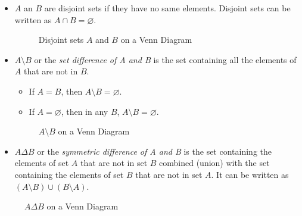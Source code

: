 \begin{itemize}
\begin{itemize}
		\item $A$ an $B$ are disjoint sets if they have no same elements. Disjoint sets can be written as $A \cap B=\varnothing$.
		\begin{figure}[!ht]
			\centering
			\caption{Disjoint sets $A$ and $B$ on a Venn Diagram}
		\end{figure}
		
		\item $A \setminus B$ or the \textit{set difference of A and B} is the set containing all the elements of $A$ that are not in $B$.
		\begin{itemize}
			\item If $A=B$, then $A \setminus B=\varnothing$.
			\item If $A=\varnothing$, then in any $B$, $A \setminus B=\varnothing$.
		\end{itemize}
		\begin{figure}[!ht]
			\centering
			\caption{$A \setminus B$ on a Venn Diagram}
		\end{figure}
		
		\item $A \Delta B$ or the \textit{symmetric difference of A and B} is  the set containing the elements of set $A$ that are not in set $B$ combined (union) with the set containing the elements of set $B$ that are not in set $A$. It can be written as $(A \setminus B) \cup (B \setminus A)$. 
		
	\end{itemize}
	
	\begin{figure}[!ht]
		\centering
		\caption{$A \Delta B$ on a Venn Diagram}
	\end{figure}
	

\end{itemize}
